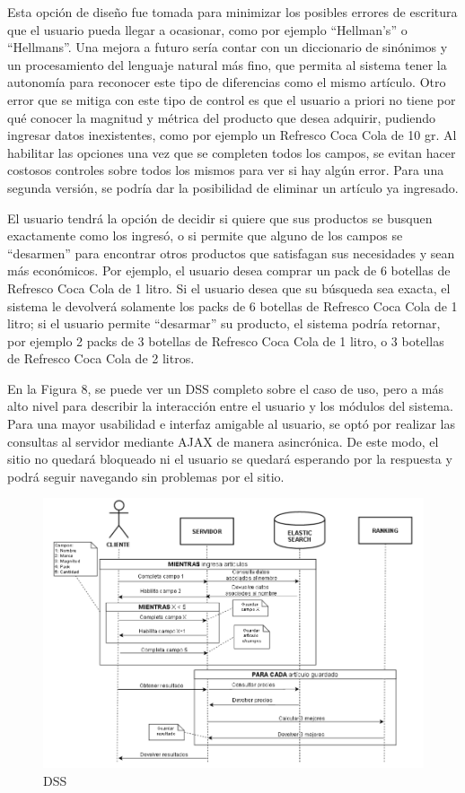\documentclass[12pt]{article} %
\begin{document}
Esta opción de diseño fue tomada para minimizar los posibles errores de escritura que el usuario pueda llegar a ocasionar, como por ejemplo “Hellman’s” o “Hellmans”. Una mejora a futuro sería contar con un diccionario de sinónimos y un procesamiento del lenguaje natural más fino, que permita al sistema tener la autonomía para reconocer este tipo de diferencias como el mismo artículo. Otro error que se mitiga con este tipo de control es que el usuario a priori no tiene por qué conocer la magnitud y métrica del producto que desea adquirir, pudiendo ingresar datos inexistentes, como por ejemplo un Refresco Coca Cola de 10 gr. Al habilitar las opciones una vez que se completen todos los campos, se evitan hacer costosos controles sobre todos los mismos para ver si hay algún error. Para una segunda versión, se podría dar la posibilidad de eliminar un artículo ya ingresado.

El usuario tendrá la opción de decidir si quiere que sus productos se busquen exactamente como los ingresó, o si permite que alguno de los campos se “desarmen” para encontrar otros productos que satisfagan sus necesidades y sean más económicos. 
Por ejemplo, el usuario desea comprar un pack de 6 botellas de Refresco Coca Cola de 1 litro. Si el usuario desea que su búsqueda sea exacta, el sistema le devolverá solamente los packs de 6 botellas de Refresco Coca Cola de 1 litro; si el usuario permite “desarmar” su producto, el sistema podría retornar, por ejemplo 2 packs de 3 botellas de Refresco Coca Cola de 1 litro, o 3 botellas de Refresco Coca Cola de 2 litros.


En la Figura 8, se puede ver un DSS completo sobre el caso de uso, pero a más alto nivel para describir la interacción entre el usuario y los módulos del sistema. Para una mayor usabilidad e interfaz amigable al usuario, se optó por realizar las consultas al servidor mediante AJAX de manera asincrónica. De este modo, el sitio no quedará bloqueado ni el usuario se quedará esperando por la respuesta y podrá seguir navegando sin problemas por el sitio.

\begin{figure}[H]
\includegraphics[height=0.40\textwidth]{DSS}
\centering
\caption{DSS}
\end{figure}
\end{document}

